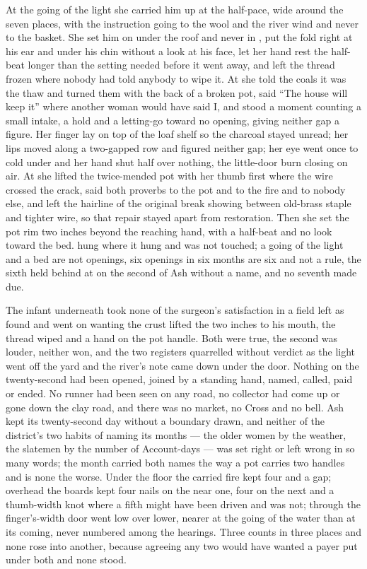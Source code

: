 At the going of the light she carried him up at the half-pace, wide around the seven places, with the instruction going to the wool and the river wind and never to the basket. She set him on  under the roof and never in , put the fold right at his ear and under his chin without a look at his face, let her hand rest the half-beat longer than the setting needed before it went away, and left the thread frozen where nobody had told anybody to wipe it. At  she told the coals it was the thaw and turned them with the back of a broken pot, said “The house will keep it” where another woman would have said I, and stood a moment counting a small intake, a hold and a letting-go toward no opening, giving neither gap a figure. Her finger lay on top of the loaf shelf so the charcoal stayed unread; her lips moved along a two-gapped row and figured neither gap; her eye went once to  cold under  and her hand shut half over nothing, the little-door burn closing on air. At  she lifted the twice-mended pot with her thumb first where the wire crossed the crack, said both proverbs to the pot and to the fire and to nobody else, and left the hairline of the original break showing between old-brass staple and tighter wire, so that repair stayed apart from restoration. Then she set the pot rim two inches beyond the reaching hand, with a half-beat and no look toward the bed.  hung where it hung and was not touched; a going of the light and a bed are not openings, six openings in six months are six and not a rule, the sixth held behind at  on the second of Ash without a name, and no seventh made due.

The infant underneath took none of the surgeon’s satisfaction in a field left as found and went on wanting the crust lifted the two inches to his mouth, the thread wiped and a hand on the pot handle. Both were true, the second was louder, neither won, and the two registers quarrelled without verdict as the light went off the yard and the river’s note came down under the door. Nothing on the twenty-second had been opened, joined by a standing hand, named, called, paid or ended. No runner had been seen on any road, no collector had come up or gone down the clay road, and there was no market, no Cross and no bell. Ash kept its twenty-second day without a boundary drawn, and neither of the district’s two habits of naming its months --- the older women by the weather, the slatemen by the number of Account-days --- was set right or left wrong in so many words; the month carried both names the way a pot carries two handles and is none the worse. Under the floor the carried fire kept four and a gap; overhead the boards kept four nails on the near one, four on the next and a thumb-width knot where a fifth might have been driven and was not; through the finger’s-width door  went low over lower, nearer at the going of the water than at its coming, never numbered among the hearings. Three counts in three places and none rose into another, because agreeing any two would have wanted a payer put under both and none stood.

